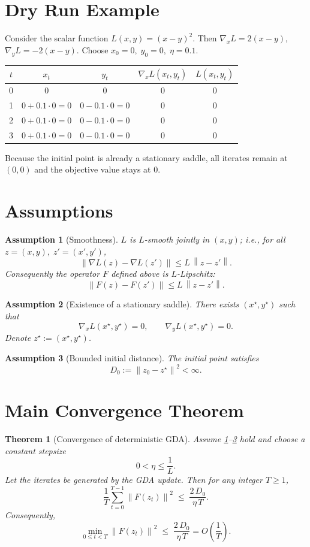 \documentclass{article}
\newtheorem{theorem}{Theorem}
\newtheorem{assumption}{Assumption}
\newcommand{\norm}[1]{\left\lVert#1\right\rVert}
\begin{document}
\section*{Dry Run Example}
Consider the scalar function \(L(x,y)= (x-y)^2\).  
Then \(\nabla_x L=2(x-y)\), \(\nabla_y L=-2(x-y)\).  
Choose \(x_0=0,\;y_0=0,\;\eta=0.1\).

\begin{center}
\begin{tabular}{c|c|c|c|c}
$t$ & $x_t$ & $y_t$ & $\nabla_x L(x_t,y_t)$ & $L(x_t,y_t)$\\\hline
0 & $0$ & $0$ & $0$ & $0$\\
1 & $0+0.1\cdot0=0$ & $0-0.1\cdot0=0$ & $0$ & $0$\\
2 & $0+0.1\cdot0=0$ & $0-0.1\cdot0=0$ & $0$ & $0$\\
3 & $0+0.1\cdot0=0$ & $0-0.1\cdot0=0$ & $0$ & $0$
\end{tabular}
\end{center}
Because the initial point is already a stationary saddle, all iterates remain at \((0,0)\) and the objective value stays at \(0\).

\newpage

\section*{Assumptions}
\begin{assumption}[Smoothness]\label{ass:smooth}
\(L\) is \(L\)-smooth jointly in \((x,y)\); i.e., for all \(z=(x,y),\;z'=(x',y')\),
\[
\norm{\nabla L(z)-\nabla L(z')}\le L\,\norm{z-z'}.
\]
Consequently the operator \(F\) defined above is \(L\)-Lipschitz:
\[
\norm{F(z)-F(z')}\le L\,\norm{z-z'} .
\]
\end{assumption}

\begin{assumption}[Existence of a stationary saddle]\label{ass:saddle}
There exists \((x^\star,y^\star)\) such that 
\[
\nabla_x L(x^\star,y^\star)=0,\qquad \nabla_y L(x^\star,y^\star)=0.
\]
Denote \(z^\star:=(x^\star,y^\star)\).
\end{assumption}

\begin{assumption}[Bounded initial distance]\label{ass:bound}
The initial point satisfies
\[
D_0:=\norm{z_0-z^\star}^2<\infty .
\]
\end{assumption}

\section*{Main Convergence Theorem}
\begin{theorem}[Convergence of deterministic GDA]\label{thm:main}
Assume \ref{ass:smooth}--\ref{ass:bound} hold and choose a constant stepsize
\[
0<\eta\le\frac{1}{L}.
\]
Let the iterates be generated by the GDA update. Then for any integer \(T\ge1\),
\[
\frac{1}{T}\sum_{t=0}^{T-1}\norm{F(z_t)}^{2}
\;\le\;
\frac{2\,D_0}{\eta\,T}.
\tag{1}
\]
Consequently,
\[
\min_{0\le t<T}\norm{F(z_t)}^{2}
\;\le\;
\frac{2\,D_0}{\eta\,T}=O\!\left(\frac{1}{T}\right).
\]
\end{theorem}
\end{document}

